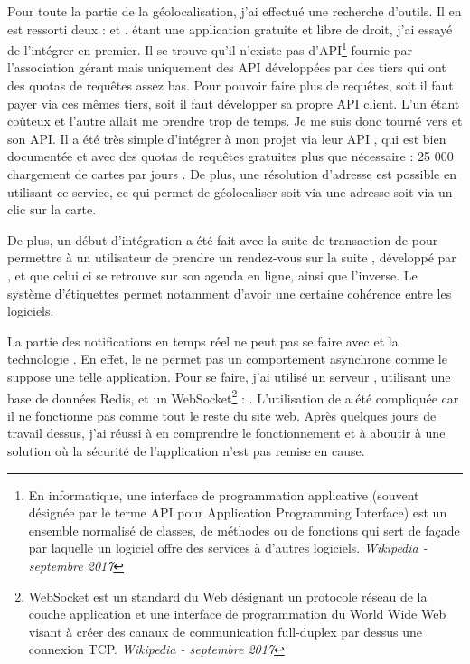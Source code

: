 \documentclass[a4paper, 11pt]{report}
\begin{document}
    Pour toute la partie de la géolocalisation, j'ai effectué une recherche d'outils. Il en est ressorti deux : \osm\cite{osm} et \gmap\cite{gmap}. \osm étant une application gratuite et libre de droit, j'ai essayé de l'intégrer en premier. Il se trouve qu'il n'existe pas d'API\footnote{En informatique, une interface de programmation applicative (souvent désignée par le terme API pour Application Programming Interface) est un ensemble normalisé de classes, de méthodes ou de fonctions qui sert de façade par laquelle un logiciel offre des services à d'autres logiciels. \textit{Wikipedia - septembre 2017}} fournie par l'association gérant \osm mais uniquement des API développées par des tiers qui ont des quotas de requêtes assez bas. Pour pouvoir faire plus de requêtes, soit il faut payer via ces mêmes tiers, soit il faut développer sa propre API client. L'un étant coûteux et l'autre allait me prendre trop de temps. Je me suis donc tourné vers \gmap et son API. Il a été très simple d'intégrer \gmap à mon projet via leur API \js, qui est bien documentée et avec des quotas de requêtes gratuites plus que nécessaire : 25 000 chargement de cartes par jours \cite{gmap_prices}. De plus, une résolution d'adresse est possible en utilisant ce service, ce qui permet de géolocaliser soit via une adresse soit via un clic sur la carte.

    De plus, un début d'intégration a été fait avec la suite de transaction de \lgk pour permettre à un utilisateur de prendre un rendez-vous sur la suite \ulti, développé par \lgk, et que celui ci se retrouve sur son agenda en ligne, ainsi que l'inverse. Le système d'étiquettes permet notamment d'avoir une certaine cohérence entre les logiciels.

    La partie des notifications en temps réel ne peut pas se faire avec \symfony et la technologie \php. En effet, le \php ne permet pas un comportement asynchrone comme le suppose une telle application. Pour se faire, j'ai utilisé un serveur \njs, utilisant une base de données Redis, et un WebSocket\footnote{WebSocket est un standard du Web désignant un protocole réseau de la couche application et une interface de programmation du World Wide Web visant à créer des canaux de communication full-duplex par dessus une connexion TCP. \textit{Wikipedia - septembre 2017}} : \io\cite{io}. L'utilisation de \io a été compliquée car il ne fonctionne pas comme tout le reste du site web. Après quelques jours de travail dessus, j'ai réussi à en comprendre le fonctionnement et à aboutir à une solution où la sécurité de l'application n'est pas remise en cause.
\end{document}
